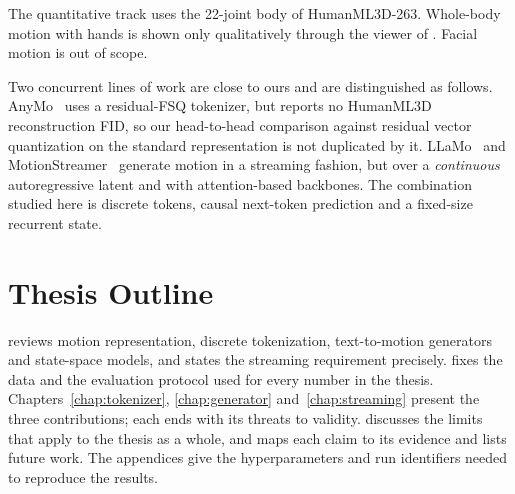 The quantitative track uses the 22-joint body of HumanML3D-263. Whole-body motion with hands is shown only qualitatively through the viewer of . Facial motion is out of scope.

Two concurrent lines of work are close to ours and are distinguished as follows. AnyMo~\cite{li2026anymo} uses a residual-FSQ tokenizer, but reports no HumanML3D reconstruction FID, so our head-to-head comparison against residual vector quantization on the standard representation is not duplicated by it. LLaMo~\cite{li2026llamo} and MotionStreamer~\cite{xiao2025motionstreamer} generate motion in a streaming fashion, but over a \emph{continuous} autoregressive latent and with attention-based backbones. The combination studied here is discrete tokens, causal next-token prediction and a fixed-size recurrent state.

\section{Thesis Outline}
\label{sec:intro_outline}

 reviews motion representation, discrete tokenization, text-to-motion generators and state-space models, and states the streaming requirement precisely.  fixes the data and the evaluation protocol used for every number in the thesis. Chapters~\ref{chap:tokenizer}, \ref{chap:generator} and~\ref{chap:streaming} present the three contributions; each ends with its threats to validity.  discusses the limits that apply to the thesis as a whole, and  maps each claim to its evidence and lists future work. The appendices give the hyperparameters and run identifiers needed to reproduce the results.
